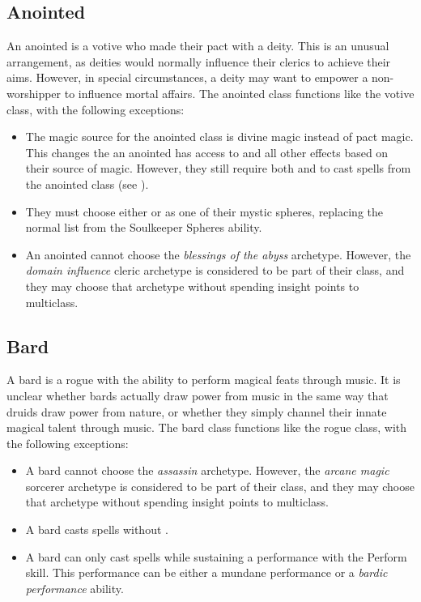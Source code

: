   \subsection{Anointed}
    An anointed is a votive who made their pact with a deity.
    This is an unusual arrangement, as deities would normally influence their clerics to achieve their aims.
    However, in special circumstances, a deity may want to empower a non-worshipper to influence mortal affairs.
    The anointed class functions like the votive class, with the following exceptions:
    \begin{itemize}
      \item The magic source for the anointed class is divine magic instead of pact magic.
        This changes the  an anointed has access to and all other effects based on their source of magic.
        However, they still require both  and  to cast spells from the anointed class (see ).
      \item They must choose either  or  as one of their mystic spheres, replacing the normal list from the Soulkeeper Spheres ability.
      \item An anointed cannot choose the \textit{blessings of the abyss} archetype. However, the \textit{domain influence} cleric archetype is considered to be part of their class, and they may choose that archetype without spending insight points to multiclass.
    \end{itemize}

  \subsection{Bard}
    A bard is a rogue with the ability to perform magical feats through music.
    It is unclear whether bards actually draw power from music in the same way that druids draw power from nature, or whether they simply channel their innate magical talent through music.
    The bard class functions like the rogue class, with the following exceptions:
    \begin{itemize}
      \item A bard cannot choose the \textit{assassin} archetype. However, the \textit{arcane magic} sorcerer archetype is considered to be part of their class, and they may choose that archetype without spending insight points to multiclass.
      \item A bard casts spells without .
      \item A bard can only cast spells while sustaining a performance with the Perform skill. This performance can be either a mundane performance or a \textit{bardic performance} ability.
    \end{itemize}

